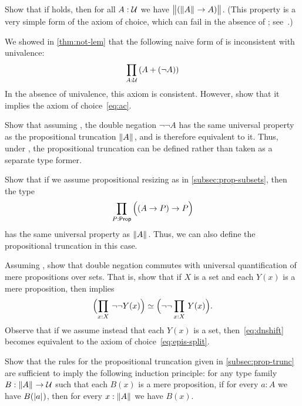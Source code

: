 \begin{ex}\label{ex:lem-impl-simple-ac}
  Show that if \LEM{} holds, then for all $A:\mathcal{U}$ we have $\bigl\Vert (\mathopen{}\left\Vert A\right\Vert_{}\mathclose{} \to A)\bigr\Vert_{}$.
  (This property is a very simple form of the axiom of choice, which can fail in the absence of \LEM{}; see~\cite{krausgeneralizations}.)
\end{ex}

\begin{ex}\label{ex:naive-lem-impl-ac}
  We showed in \autoref{thm:not-lem} that the following naive form of \LEM{} is inconsistent with univalence:
  \[ \prd{A:\type} (A+(\neg A)) \]
  In the absence of univalence, this axiom is consistent.
  However, show that it implies the axiom of choice~\eqref{eq:ac}.
\end{ex}

\begin{ex}\label{ex:lem-brck}
  Show that assuming \LEM{}, the double negation $\neg \neg A$ has the same universal property as the propositional truncation $\mathopen{}\left\Vert A\right\Vert_{}\mathclose{}$, and is therefore equivalent to it.
  Thus, under \LEM{}, the propositional truncation can be defined rather than taken as a separate type former.
\end{ex}

\begin{ex}\label{ex:impred-brck}
  Show that if we assume propositional resizing as in \autoref{subsec:prop-subsets}, then the type
  \[\prd{P:\prop} \Parens{(A\to P)\to P}\]
  has the same universal property as $\mathopen{}\left\Vert A\right\Vert_{}\mathclose{}$.
  Thus, we can also define the propositional truncation in this case.
\end{ex}

\begin{ex}\label{ex:lem-impl-dn-commutes}
  Assuming \LEM{}, show that double negation commutes with universal quantification of mere propositions over sets.
  That is, show that if $X$ is a set and each $Y(x)$ is a mere proposition, then \LEM{} implies
  \begin{equation}
    \eqv{\Parens{\prd{x:X} \neg\neg Y(x)}}{\Parens{\neg\neg \prd{x:X} Y(x)}}.\label{eq:dnshift}
  \end{equation}
  Observe that if we assume instead that each $Y(x)$ is a set, then~\eqref{eq:dnshift} becomes equivalent to the axiom of choice~\eqref{eq:epis-split}.
\end{ex}

\begin{ex}\label{ex:prop-trunc-ind}
  Show that the rules for the propositional truncation given in \autoref{subsec:prop-trunc} are sufficient to imply the following induction principle: for any type family $B:\mathopen{}\left\Vert A\right\Vert_{}\mathclose{} \to \mathcal{U}$ such that each $B(x)$ is a mere proposition, if for every $a:A$ we have $B(\mathopen{}\left|a\right|_{}^{}\mathclose{})$, then for every $x:\mathopen{}\left\Vert A\right\Vert_{}\mathclose{}$ we have $B(x)$.
\end{ex}

